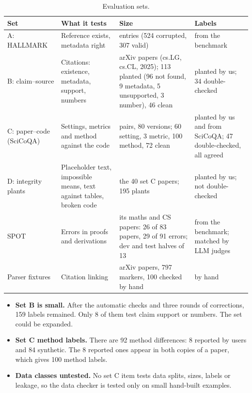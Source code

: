 \documentclass[11pt,a4paper]{article}
\begin{document}
\begin{table}[h]
\centering\small
\caption{Evaluation sets.}
\label{tab:data}
\begin{tabularx}{\textwidth}{@{}>{\raggedright\arraybackslash}p{2.7cm}>{\raggedright\arraybackslash}p{3.6cm}>{\raggedright\arraybackslash}X>{\raggedright\arraybackslash}p{3.1cm}@{}}
\toprule
Set & What it tests & Size & Labels \\
\midrule
A: HALLMARK~\cite{hallmark} & Reference exists, metadata right & 831 entries (524 corrupted, 307 valid) & from the benchmark \\
B: claim--source & Citations: existence, metadata, support, numbers & 60 arXiv papers (cs.LG, cs.CL, 2025); 113 planted (96 not found, 9 metadata, 5 unsupported, 3 number), 46 clean & planted by us; 34 double-checked \\
C: paper--code (SciCoQA) & Settings, metrics and method against the code & 40 pairs, 80 versions; 60 setting, 3 metric, 100 method, 72 clean & planted by us and from SciCoQA; 47 double-checked, all agreed \\
D: integrity plants & Placeholder text, impossible means, text against tables, broken code & the 40 set C papers; 195 plants & planted by us; not double-checked \\
SPOT~\cite{spot} & Errors in proofs and derivations & its maths and CS papers: 26 of 83 papers, 29 of 91 errors; dev and test halves of 13 & from the benchmark; matched by LLM judges \\
Parser fixtures & Citation linking & 10 arXiv papers, 797 markers, 100 checked by hand & by hand \\
\bottomrule
\end{tabularx}
\end{table}

\begin{itemize}
\item \textbf{Set B is small.} After the automatic checks and three rounds of corrections, 159
labels remained. Only 8 of them test claim support or numbers. The set could be expanded.
\item \textbf{Set C method labels.} There are 92 method differences: 8 reported by users and 84
synthetic. The 8 reported ones appear in both copies of a paper, which gives 100 method labels.
\item \textbf{Data classes untested.} No set C item tests data splits, sizes, labels or leakage,
so the data checker is tested only on small hand-built examples.
\end{itemize}
\end{document}
